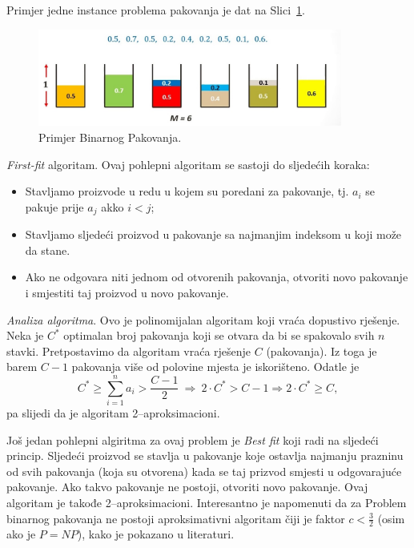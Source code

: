 \documentclass[a4paper, utf8, 11pt, colorlinks]{book}
\theoremstyle{definition}
\begin{document}
  Primjer jedne instance problema pakovanja je dat na Slici~\ref{fig:bin-packing}.

\begin{figure}[H] 
	\centering
	\includegraphics[width=100mm]{maxresdefault.eps}%
	\caption{Primjer Binarnog Pakovanja.}
    \label{fig:bin-packing}
\end{figure}
 \emph{First-fit} algoritam. Ovaj  pohlepni algoritam se sastoji do sljedećih koraka:
\begin{itemize}
	\item Stavljamo proizvode u redu u kojem su poredani za pakovanje, tj. $a_i$ se pakuje prije $a_j$ akko $i < j$;
	\item Stavljamo sljedeći proizvod u pakovanje sa najmanjim indeksom u koji može da stane. \item Ako ne odgovara niti jednom od otvorenih pakovanja, otvoriti novo pakovanje i smjestiti taj proizvod u novo pakovanje.
\end{itemize}


\noindent \emph{Analiza algoritma}. Ovo je polinomijalan algoritam koji vraća dopustivo rješenje.  Neka je $C^*$ optimalan broj pakovanja koji se otvara da bi se spakovalo svih $n$ stavki. Pretpostavimo da algoritam vraća rješenje $C$ (pakovanja). Iz toga je barem $C-1$ pakovanja više od polovine mjesta je iskorišteno. Odatle je
$$C^* \geq \sum_{i=1}^n a_i > \frac{C-1}{2}\ \Rightarrow\  2 \cdot C^* > C-1 \Rightarrow 2 \cdot C^* \geq C,$$
pa slijedi da je algoritam 2--aproksimacioni. 

 Još jedan pohlepni algiritma za ovaj problem je \emph{Best fit} koji radi na sljedeći princip. Sljedeći proizvod se stavlja u pakovanje koje ostavlja najmanju prazninu od svih pakovanja (koja su otvorena) kada se taj prizvod smjesti u odgovarajuće pakovanje. Ako takvo pakovanje ne postoji, otvoriti novo pakovanje. 
Ovaj algoritam je takođe 2--aproksimacioni. Interesantno je napomenuti da za Problem binarnog pakovanja ne postoji aproksimativni algoritam čiji je faktor $c <\frac{3}{2}$ (osim ako je $P=NP$), kako je pokazano u literaturi. 
\end{document}
